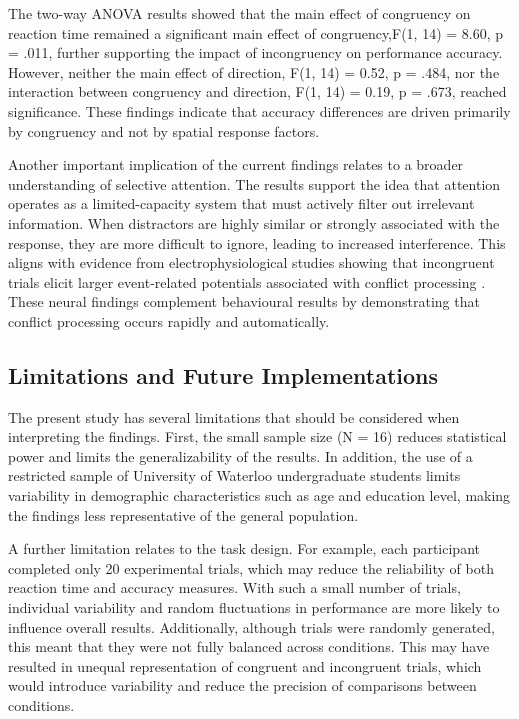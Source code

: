 \documentclass[
  authoryear,
  preprint]{elsarticle}
\begin{document}
The two-way ANOVA results showed that the main effect of congruency on
reaction time remained a significant main effect of congruency,F(1, 14)
= 8.60, p = .011, further supporting the impact of incongruency on
performance accuracy. However, neither the main effect of direction,
F(1, 14) = 0.52, p = .484, nor the interaction between congruency and
direction, F(1, 14) = 0.19, p = .673, reached significance. These
findings indicate that accuracy differences are driven primarily by
congruency and not by spatial response factors.

Another important implication of the current findings relates to a
broader understanding of selective attention. The results support the
idea that attention operates as a limited-capacity system that must
actively filter out irrelevant information. When distractors are highly
similar or strongly associated with the response, they are more
difficult to ignore, leading to increased interference. This aligns with
evidence from electrophysiological studies showing that incongruent
trials elicit larger event-related potentials associated with conflict
processing \citep{clayson2011}. These neural findings complement
behavioural results by demonstrating that conflict processing occurs
rapidly and automatically.

\subsection{Limitations and Future
Implementations}\label{limitations-and-future-implementations}

The present study has several limitations that should be considered when
interpreting the findings. First, the small sample size (N = 16) reduces
statistical power and limits the generalizability of the results. In
addition, the use of a restricted sample of University of Waterloo
undergraduate students limits variability in demographic characteristics
such as age and education level, making the findings less representative
of the general population.

A further limitation relates to the task design. For example, each
participant completed only 20 experimental trials, which may reduce the
reliability of both reaction time and accuracy measures. With such a
small number of trials, individual variability and random fluctuations
in performance are more likely to influence overall results.
Additionally, although trials were randomly generated, this meant that
they were not fully balanced across conditions. This may have resulted
in unequal representation of congruent and incongruent trials, which
would introduce variability and reduce the precision of comparisons
between conditions.
\end{document}
